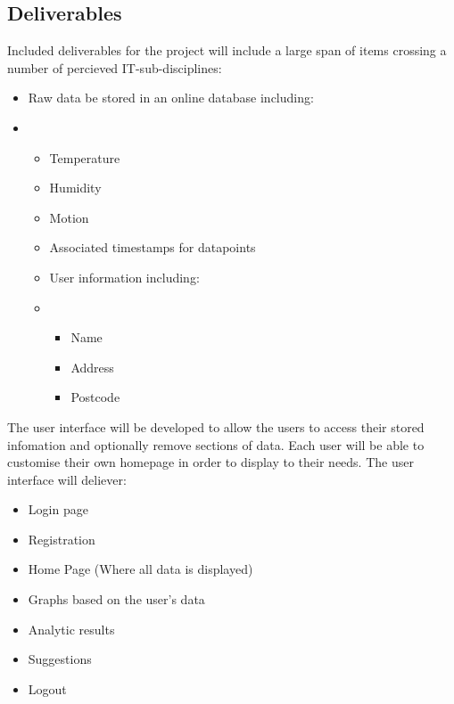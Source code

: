 \documentclass{article}
\begin{document}
        \vspace{10mm}

        \subsection{Deliverables}
            Included deliverables for the project will include a large span of items crossing a number
            of percieved IT-sub-disciplines:
            \begin{itemize}
                \item Raw data be stored in an online database including:
                \item \begin{itemize}
                    \item Temperature
                    \item Humidity
                    \item Motion
                    \item Associated timestamps for datapoints
                    \item User information including:
                    \item \begin{itemize}
                        \item Name
                        \item Address
                        \item Postcode
                    \end{itemize}
                \end{itemize}
            \end{itemize}

            The user interface will be developed to allow the users to access their stored
            infomation and optionally remove sections of data. Each user will be able to customise 
            their own homepage in order to display to their needs. The user interface will deliever:
            \begin{itemize}
                \item Login page
                \item Registration
                \item Home Page (Where all data is displayed)
                \item Graphs based on the user's data
                \item Analytic results
                \item Suggestions
                \item Logout
            \end{itemize}
            \newpage
\end{document}
